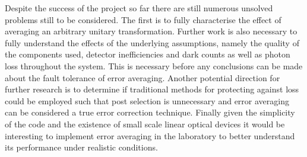 \documentclass[aps,pra,twocolumn,superscriptaddress,numerical]{revtex4-1}
\begin{document}
	Despite the success of the project so far there are still numerous unsolved problems still to be considered. The first is to fully characterise the effect of averaging an arbitrary unitary transformation. Further work is also necessary to fully understand the effects of the underlying assumptions, namely the quality of the components used, detector inefficiencies and dark counts as well as photon loss throughout the system. This is necessary before any conclusions can be made about the fault tolerance of error averaging. Another potential direction for further research is to determine if traditional methods for protecting against loss \cite{LossCorrectionTim,LossCorrection}  could be employed such that post selection is unnecessary and error averaging can be considered a true error correction technique. Finally given the simplicity of the code and the existence of small scale linear optical devices it would be interesting to implement error averaging in the laboratory to better understand its performance under realistic conditions. 
	

\end{document}
